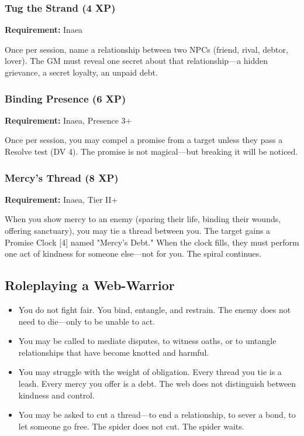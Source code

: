 \subsubsection{Tug the Strand (4 XP)}

\textbf{Requirement:} Inaea

Once per session, name a relationship between two NPCs (friend, rival, debtor, lover). The GM must reveal one secret about that relationship—a hidden grievance, a secret loyalty, an unpaid debt.

\subsubsection{Binding Presence (6 XP)}

\textbf{Requirement:} Inaea, Presence 3+

Once per session, you may compel a promise from a target unless they pass a Resolve test (DV 4). The promise is not magical—but breaking it will be noticed.

\subsubsection{Mercy's Thread (8 XP)}

\textbf{Requirement:} Inaea, Tier II+

When you show mercy to an enemy (sparing their life, binding their wounds, offering sanctuary), you may tie a thread between you. The target gains a Promise Clock [4] named "Mercy's Debt." When the clock fills, they must perform one act of kindness for someone else—not for you. The spiral continues.

\subsection{Roleplaying a Web-Warrior}

\begin{itemize}
\item You do not fight fair. You bind, entangle, and restrain. The enemy does not need to die—only to be unable to act.
\item You may be called to mediate disputes, to witness oaths, or to untangle relationships that have become knotted and harmful.
\item You may struggle with the weight of obligation. Every thread you tie is a leash. Every mercy you offer is a debt. The web does not distinguish between kindness and control.
\item You may be asked to cut a thread—to end a relationship, to sever a bond, to let someone go free. The spider does not cut. The spider waits.
\end{itemize}

